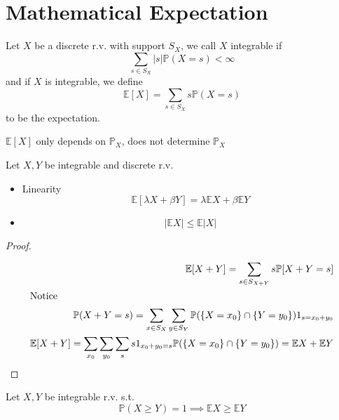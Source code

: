\documentclass[../main.tex]{subfiles}
\begin{document}
\section{Mathematical Expectation}
\begin{defn}
	Let $X$ be a discrete r.v. with support $S_X$, we call $X$ integrable if 
	\[ 
	\sum_{s \in S_X} |s| \mathbb{P}( X =s) < \infty 
	\]
	and if $X$ is integrable, we define
	\[ 
	\mathbb{E} [ X] = \sum_{s\in S_X} s \mathbb{P}( X=s) 
	\]
	to be the expectation.
\end{defn}
\begin{rmq}
$ \mathbb{E}[X] $ only depends on $ \mathbb{P}_X$, does not determine $ \mathbb{P}_X$ 
\end{rmq}
\begin{propo}
Let $X,Y$ be integrable and discrete r.v.
\begin{itemize}
\item Linearity
	\[ 
	\mathbb{E}[ \lambda X + \beta Y] = \lambda \mathbb{E} X + \beta \mathbb{E}Y
	\]

\item 
	\[ 
	| \mathbb{E} X| \leq  \mathbb{E}|X|
	\]
	
	
\end{itemize}

\end{propo}
\begin{proof}
\begin{align*}
\mathbb{E} [ X+Y] = \sum_{s\in S_{X+Y} }^{ } s \mathbb{P} [ X+Y=s] \\
\intertext{Notice}
\mathbb{P}( X+Y=s) = \sum_{x\in S_X}^{ } \sum_{y\in S_Y}^{ } \mathbb{P}(  \left\{ X=x_0 \right\} \cap \left\{ Y=y_0 \right\} ) 1_{s= x_0+y_0} \\
\mathbb{E} [ X+Y] =\sum_{x_0} \sum_{y_0} \sum_s s 1_{x_0+y_0=s} \mathbb{P}(  \left\{ X=x_0 \right\} \cap \left\{ Y=y_0 \right\} ) = \mathbb{E} X + \mathbb{E}Y	
\end{align*}

\end{proof}

\begin{crly}
Let $X,Y$ be integrable r.v. s.t.
\[ 
\mathbb{P}( X \geq Y)  =1 \implies \mathbb{E}X \geq \mathbb{E}Y
\]

\end{crly}
\end{document}
